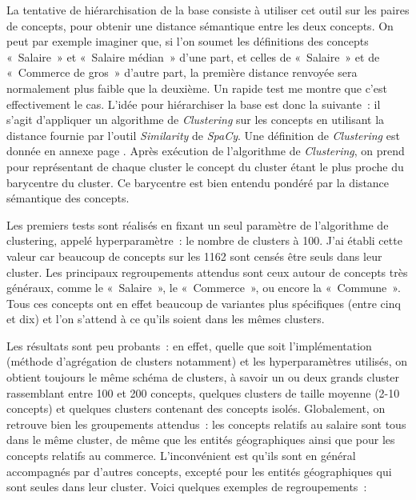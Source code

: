 La tentative de hiérarchisation de la base consiste à utiliser cet outil sur les paires de concepts, pour obtenir une distance sémantique entre les deux concepts. On peut par exemple imaginer que, si l'on soumet les définitions des concepts «~Salaire~» et «~Salaire médian~» d'une part, et celles de «~Salaire~» et de «~Commerce de gros~» d'autre part, la première distance renvoyée sera normalement plus faible que la deuxième. Un rapide test me montre que c'est effectivement le cas. L'idée pour hiérarchiser la base est donc la suivante~: il s'agit d'appliquer un algorithme de \textit{Clustering} sur les concepts en utilisant la distance fournie par l'outil \textit{Similarity} de \textit{SpaCy}. Une définition de \textit{Clustering} est donnée en annexe page \pageref{clustering}. Après exécution de l'algorithme de \textit{Clustering}, on prend pour représentant de chaque cluster le concept du cluster étant le plus proche du barycentre du cluster. Ce barycentre est bien entendu pondéré par la distance sémantique des concepts.
\newline

Les premiers tests sont réalisés en fixant un seul paramètre de l'algorithme de clustering, appelé hyperparamètre~: le nombre de clusters à 100. J'ai établi cette valeur car beaucoup de concepts sur les 1162 sont censés être seuls dans leur cluster. Les principaux regroupements attendus sont ceux autour de concepts très généraux, comme le «~Salaire~», le «~Commerce~», ou encore la «~Commune~». Tous ces concepts ont en effet beaucoup de variantes plus spécifiques (entre cinq et dix) et l'on s'attend à ce qu'ils soient dans les mêmes clusters.
\newline

Les résultats sont peu probants~: en effet, quelle que soit l'implémentation (méthode d'agrégation de clusters notamment) et les hyperparamètres utilisés, on obtient toujours le même schéma de clusters, à savoir un ou deux grands cluster rassemblant entre 100 et 200 concepts, quelques clusters de taille moyenne (2-10 concepts) et quelques clusters contenant des concepts isolés. Globalement, on retrouve bien les groupements attendus~: les concepts relatifs au salaire sont tous dans le même cluster, de même que les entités géographiques ainsi que pour les concepts relatifs au commerce. L'inconvénient est qu'ils sont en général accompagnés par d'autres concepts, excepté pour les entités géographiques qui sont seules dans leur cluster. Voici quelques exemples de regroupements~:
\newline

